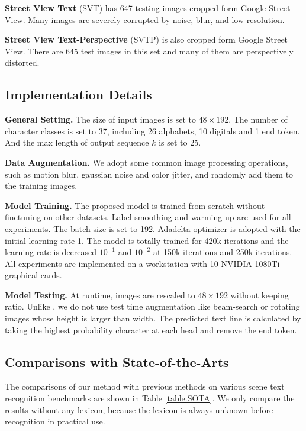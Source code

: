\documentclass[final]{cvpr}
\begin{document}
\textbf{Street View Text} (SVT) \cite{wang2011end} has 647 testing images cropped form Google Street View. Many images are severely corrupted by noise, blur, and low resolution.

\textbf{Street View Text-Perspective }(SVTP) \cite{phan2013recognizing} is also cropped form Google Street View. There are 645 test images in this set and many of them are perspectively distorted.

\subsection{Implementation Details}
\label{section.implementation_details}

\textbf{General Setting.}
The size of input images is set to $48\times192$. The number of character classes is set to 37, including 26 alphabets, 10 digitals and 1 end token. And the max length of output sequence $k$ is set to 25.

\textbf{Data Augmentation.}
We adopt some common image processing operations, such as motion blur, gaussian noise and color jitter, and randomly add them to the training images.

\textbf{Model Training.}
The proposed model is trained from scratch without finetuning on other datasets. Label smoothing and warming up are used for all experiments. The batch size is set to 192. Adadelta optimizer is adopted with the initial learning rate 1. The model is totally trained for 420k iterations and the learning rate is decreased $10^{-1}$ and $10^{-2}$ at 150k iterations and 250k iterations. All experiments are implemented on a workstation with 10 NVIDIA 1080Ti graphical cards.

\textbf{Model Testing.}
At runtime, images are rescaled to $48\times192$ without keeping ratio. Unlike \cite{li2019show, litman2020scatter}, we do not use test time augmentation like beam-search or rotating images whose height is larger than width. The predicted text line is calculated by taking the highest probability character at each head and remove the end token.

\subsection{Comparisons with State-of-the-Arts}

The comparisons of our method with previous methods on various scene text recognition benchmarks are shown in Table \ref{table.SOTA}.  We only compare the results without any lexicon, because the lexicon is always unknown before recognition in practical use.
\end{document}
